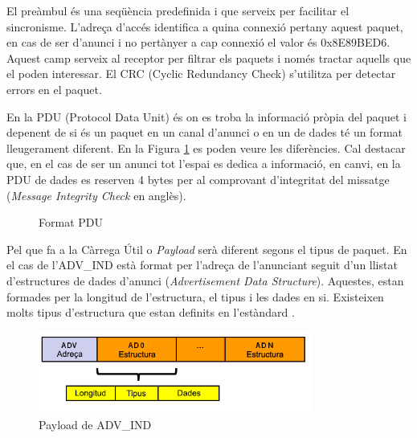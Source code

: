 El preàmbul és una seqüència predefinida i que serveix per facilitar el sincronisme.
L'adreça d'accés identifica a quina connexió pertany aquest paquet, en cas de ser d'anunci i no pertànyer a cap connexió el valor és 0x8E89BED6.
Aquest camp serveix al receptor per filtrar els paquets i només tractar aquells que el poden interessar.
El CRC (Cyclic Redundancy Check) s'utilitza per detectar errors en el paquet. 

En la PDU (Protocol Data Unit) és on es troba la informació pròpia del paquet i depenent de si és un paquet en un canal d'anunci o en un de dades té un format lleugerament diferent.
En la Figura \ref{fig:pdu_format} es poden veure les diferències.
Cal destacar que, en el cas de ser un anunci tot l'espai es dedica a informació, en canvi, en la PDU de dades es reserven 4 bytes per al comprovant d'integritat del missatge (\textit{Message Integrity Check} en anglès).

\begin{figure}[!h]
	\begin{center}
		\begin{subfigmatrix}{1}
		\end{subfigmatrix}
	\end{center}
	\caption{Format PDU}
	\label{fig:pdu_format}
\end{figure}

Pel que fa a la Càrrega Útil o \textit{Payload} serà diferent segons el tipus de paquet.
En el cas de l'ADV\_IND està format per l'adreça de l'anunciant seguit d'un llistat d'estructures de dades d'anunci (\textit{Advertisement Data Structure}).
Aquestes, estan formades per la longitud de l'estructura, el tipus i les dades en si.
Existeixen molts tipus d'estructura que estan definits en l'estàndard \cite{AD_Types}.

\begin{figure}[!h]
	\begin{center}
		\includegraphics[width=0.8\textwidth]{./images/adv-ind-packet.png}
		\caption{Payload de ADV\_IND \cite{BLE_4.2_packet_format}}
	\end{center}
\end{figure}

